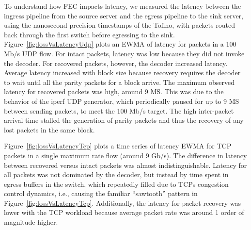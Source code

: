 To understand how FEC impacts latency, we measured the latency  between the
ingress pipeline from the source server and the egress pipeline  to the sink
server, using the nanosecond precision  timestamps of the Tofino, with packets
routed back through the first  switch before egressing to the sink.
Figure~\ref{fig:lossVsLatencyUdp}  plots an EWMA of latency for packets in a
100 Mb/s UDP flow. For  intact packets, latency was low because they did not
invoke  the decoder. For  recovered packets, however, the decoder increased
latency. Average  latency increased with block size because  recovery requires
the decoder to wait until all the parity packets  for a block arrive. The
maximum observed latency for recovered packets  was high, around 9 MS. This
was due to the behavior of the iperf  UDP generator, which periodically paused
for up to 9 MS between  sending packets, to meet the 100 Mb/s target. The high
inter-packet  arrival time stalled the generation of parity packets and thus
the  recovery of any lost packets in the same block.

Figure~\ref{fig:lossVsLatencyTcp} plots a time series of latency EWMA  for TCP
packets in a single maximum rate flow (around 9 Gb/s). The difference in
latency between recovered versus intact packets was almost indistinguishable.
Latency for all packets was not dominated by the decoder, but instead by time
spent  in egress buffers in the switch, which repeatedly filled due to TCPs
congestion  control dynamics, i.e., causing the familiar ``sawtooth'' pattern
in Figure~\ref{fig:lossVsLatencyTcp}. Additionally, the latency for packet
recovery was lower with the TCP workload because average packet rate was
around 1 order of magnitude higher.



